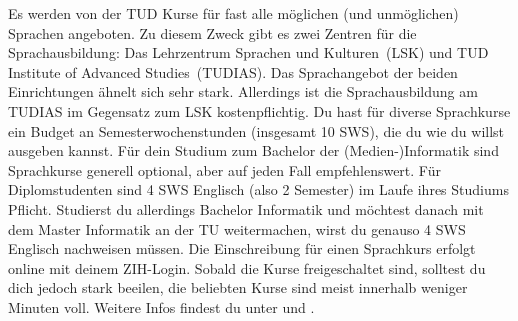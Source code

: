Es werden von der TUD Kurse für fast alle möglichen (und unmöglichen) Sprachen angeboten.
Zu diesem Zweck gibt es zwei Zentren für die Sprachausbildung: Das \glqq Lehrzentrum Sprachen und Kulturen\grqq\ (LSK) und \glqq TUD Institute of Advanced Studies\grqq\ (TUDIAS).
Das Sprachangebot der beiden Einrichtungen ähnelt sich sehr stark. Allerdings ist die Sprachausbildung am TUDIAS im Gegensatz zum LSK kostenpflichtig.
Du hast für diverse Sprachkurse ein Budget an Semesterwochenstunden (insgesamt 10 SWS), die du wie du willst ausgeben kannst.
Für dein Studium zum Bachelor der (Medien-)Informatik sind Sprachkurse generell optional, aber auf jeden Fall empfehlenswert.
Für Diplomstudenten sind 4 SWS Englisch (also 2 Semester) im Laufe ihres Studiums Pflicht.
Studierst du allerdings Bachelor Informatik und möchtest danach mit dem Master Informatik an der TU weitermachen, wirst du genauso 4 SWS Englisch nachweisen müssen.
Die Einschreibung für einen Sprachkurs erfolgt online  mit deinem ZIH-Login.
Sobald die Kurse freigeschaltet sind, solltest du dich jedoch stark beeilen, die beliebten Kurse sind meist innerhalb weniger Minuten voll.
Weitere Infos findest du unter  und .
